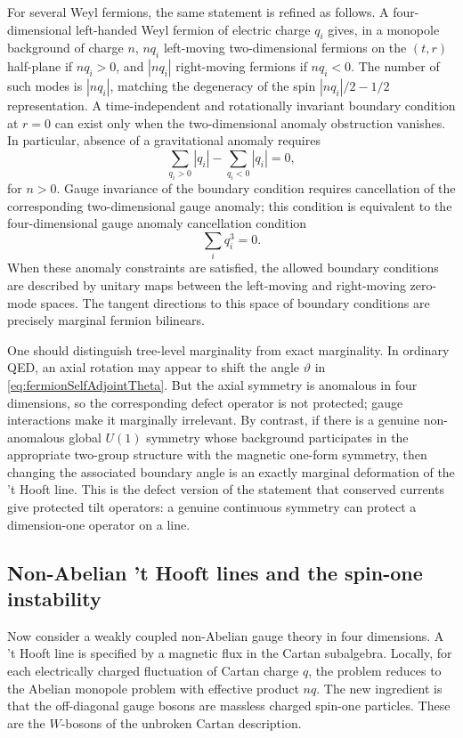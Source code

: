 \documentclass[11pt]{article}
\begin{document}
For several Weyl fermions, the same statement is refined as follows.  A four-dimensional left-handed Weyl fermion of electric charge $q_i$ gives, in a monopole background of charge $n$, $nq_i$ left-moving two-dimensional fermions on the $(t,r)$ half-plane if $nq_i>0$, and $|nq_i|$ right-moving fermions if $nq_i<0$.  The number of such modes is $|nq_i|$, matching the degeneracy of the spin $|nq_i|/2-1/2$ representation.  A time-independent and rotationally invariant boundary condition at $r=0$ can exist only when the two-dimensional anomaly obstruction vanishes.  In particular, absence of a gravitational anomaly requires
\begin{equation}
  \sum_{q_i>0}|q_i|-
  \sum_{q_i<0}|q_i|=0,
  \label{eq:thooftNoGravAnomaly}
\end{equation}
for $n>0$.  Gauge invariance of the boundary condition requires cancellation of the corresponding two-dimensional gauge anomaly; this condition is equivalent to the four-dimensional gauge anomaly cancellation condition
\begin{equation}
  \sum_i q_i^3=0 .
\end{equation}
When these anomaly constraints are satisfied, the allowed boundary conditions are described by unitary maps between the left-moving and right-moving zero-mode spaces.  The tangent directions to this space of boundary conditions are precisely marginal fermion bilinears.

One should distinguish tree-level marginality from exact marginality.  In ordinary QED, an axial rotation may appear to shift the angle $\vartheta$ in \eqref{eq:fermionSelfAdjointTheta}.  But the axial symmetry is anomalous in four dimensions, so the corresponding defect operator is not protected; gauge interactions make it marginally irrelevant.  By contrast, if there is a genuine non-anomalous global $U(1)$ symmetry whose background participates in the appropriate two-group structure with the magnetic one-form symmetry, then changing the associated boundary angle is an exactly marginal deformation of the 't Hooft line.  This is the defect version of the statement that conserved currents give protected tilt operators: a genuine continuous symmetry can protect a dimension-one operator on a line.

\subsection{Non-Abelian 't Hooft lines and the spin-one instability}

Now consider a weakly coupled non-Abelian gauge theory in four dimensions.  A 't Hooft line is specified by a magnetic flux in the Cartan subalgebra.  Locally, for each electrically charged fluctuation of Cartan charge $q$, the problem reduces to the Abelian monopole problem with effective product $nq$.  The new ingredient is that the off-diagonal gauge bosons are massless charged spin-one particles.  These are the $W$-bosons of the unbroken Cartan description.
\end{document}
